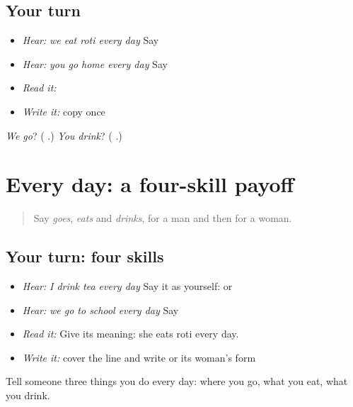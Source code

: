 \subsection*{Your turn}
\begin{itemize}
\raggedright
  \item \emph{Hear:} \emph{we eat roti every day} Say \textbf{    }
  \item \emph{Hear:} \emph{you go home every day} Say \textbf{    }
  \item \emph{Read it:} \textbf{    }
  \item \emph{Write it:} copy \textbf{} once
\end{itemize}

\begin{tcolorbox}[breakable,colback=teal!4,colframe=teal!35!black,title={Before you move on}]
\emph{We go}? (\textbf{  }.) \emph{You drink}? (\textbf{  }.)
\end{tcolorbox}
\section[\texorpdfstring{\pa{ਮੈਂ} \pa{ਰੋਜ਼} \pa{ਚਾਹ} \pa{ਪੀਂਦਾ} \pa{ਹਾਂ।} (maiṁ roz chāh …)}{ਮੈਂ ਰੋਜ਼ ਚਾਹ ਪੀਂਦਾ ਹਾਂ। (maiṁ roz chāh …)}]{Every day: a four-skill payoff}

\label{lesson:PA-C211-payoff}



\begin{quote}
Say \emph{goes}, \emph{eats} and \emph{drinks}, for a man and then for a woman.
\end{quote}

\subsection*{Your turn: four skills}
\begin{itemize}
\raggedright
  \item \emph{Hear:} \emph{I drink tea every day} Say it as yourself: \textbf{    } or \textbf{    }
  \item \emph{Hear:} \emph{we go to school every day} Say \textbf{    }
  \item \emph{Read it:} \textbf{    } Give its meaning: she eats roti every day.
  \item \emph{Write it:} cover the line and write \textbf{    } or its woman's form
\end{itemize}

\begin{tcolorbox}[breakable,colback=teal!4,colframe=teal!35!black,title={Before you move on}]
Tell someone three things you do every day: where you go, what you eat, what you drink.
\end{tcolorbox}
